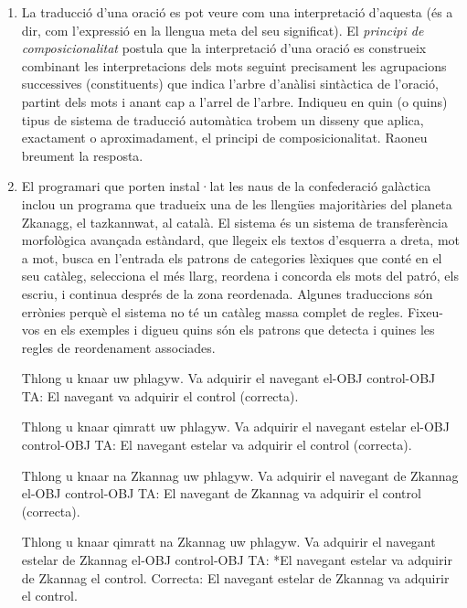 \begin{enumerate}
    \item La traducció d'una oració es pot veure com una interpretació
      d'aquesta (és a dir, com l'expressió en la llengua meta del seu
      significat). El \emph{principi de composicionalitat} postula que
      la interpretació d'una oració es construeix combinant les
      interpretacions dels mots seguint precisament les agrupacions
      successives (constituents) que indica l'arbre d'anàlisi
      sintàctica de l'oració, partint dels mots i anant cap a l'arrel
      de l'arbre. Indiqueu en quin (o quins) tipus de sistema de
      traducció automàtica trobem un disseny que aplica, exactament o
      aproximadament, el principi de composicionalitat. Raoneu
      breument la resposta.
      
    \item \label{ex:zkanagg} El programari que porten instal·lat les naus de la
      confederació galàctica inclou un programa que tradueix una de
      les llengües majoritàries del planeta Zkanagg, el tazkannwat, al
      català. El sistema és un sistema de transferència morfològica
      avançada estàndard, que llegeix els textos d'esquerra a dreta,
      mot a mot, busca en l'entrada els patrons de categories lèxiques
      que conté en el seu catàleg, selecciona el més llarg, reordena i
      concorda els mots del patró, els escriu, i continua després de
      la zona reordenada. Algunes traduccions són errònies perquè el
      sistema no té un catàleg massa complet de regles. Fixeu-vos en
      els exemples i digueu quins són els patrons que detecta i quines
      les regles de reordenament associades.
     \begin{example}
     \gll Thlong u knaar uw phlagyw.
          {Va adquirir} el navegant el-OBJ control-OBJ
     \glt TA: El navegant va adquirir el control (correcta).
     \glend
     \end{example}
     \begin{example}
     \gll Thlong u knaar qimratt uw phlagyw.
          {Va adquirir} el navegant estelar el-OBJ control-OBJ
     \glt TA: El navegant estelar va adquirir el control (correcta).
     \glend
     \end{example}
     \begin{example}
     \gll Thlong u knaar na Zkannag uw phlagyw.
          {Va adquirir} el navegant de Zkannag el-OBJ control-OBJ
     \glt TA: El navegant de Zkannag va adquirir el control (correcta).
     \glend
     \end{example}
     \begin{example}
     \gll Thlong u knaar qimratt na Zkannag uw phlagyw.
          {Va adquirir} el navegant estelar de Zkannag el-OBJ control-OBJ
     \glt TA: *El navegant estelar va adquirir de Zkannag el control.
     \glt Correcta: El navegant estelar de Zkannag va adquirir el control.
     \glend
     \end{example}



\end{enumerate}
